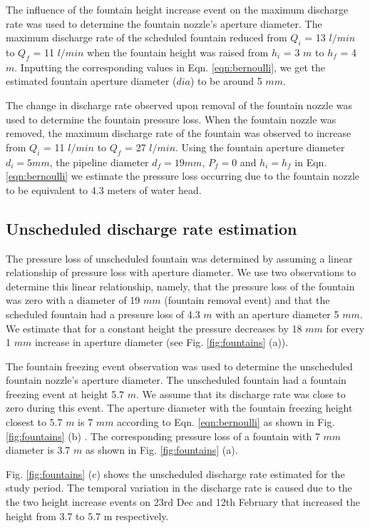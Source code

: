 \documentclass[tc, manuscript]{copernicus}
\begin{document}
The influence of the fountain height increase event on the maximum discharge rate was used to determine the
fountain nozzle's aperture diameter. The maximum discharge rate of the scheduled fountain reduced from $Q_i$ =
13 $l/min$ to $Q_f$ = 11 $l/min$ when the fountain height was raised from  $h_i$ = 3 $m$ to $h_f$ = 4 $m$.
Inputting the corresponding values in Eqn. \ref{eqn:bernoulli}, we get the estimated fountain aperture diameter
($dia$) to be around 5 $mm$. 

The change in discharge rate observed upon removal of the fountain nozzle was used to determine the fountain
pressure loss. When the fountain nozzle was removed, the maximum discharge rate of the fountain was observed to
increase from $Q_{i}$ = 11 $l/min$ to $Q_{f}$ = 27 $l/min$. Using the fountain aperture diameter $d_i = 5 mm$,
the pipeline diameter $d_f = 19 mm$, $P_{f} = 0$ and $h_{i} = h_{f}$ in Eqn. \ref{eqn:bernoulli} we estimate the
pressure loss occurring due to the fountain nozzle to be equivalent to 4.3 meters of water head.

\subsection{Unscheduled discharge rate estimation}

The pressure loss of unscheduled fountain was determined by assuming a linear relationship of pressure loss with
aperture diameter. We use two observations to determine this linear relationship, namely, that the pressure loss
of the fountain was zero with a diameter of 19 $mm$ (fountain removal event) and that the scheduled fountain had
a pressure loss of 4.3 $m$ with an aperture diameter 5 $mm$. We estimate that for a constant height the pressure
decreases by 18 $mm$ for every 1 $mm$ increase in aperture diameter (see Fig. \ref{fig:fountains} (a)).

The fountain freezing event observation was used to determine the unscheduled fountain nozzle's aperture
diameter. The unscheduled fountain had a fountain freezing event at height 5.7 $m$. We assume that its discharge
rate was close to zero during this event.  The aperture diameter with the fountain freezing height closest to
5.7 $m$ is 7 $mm$ according to Eqn. \ref{eqn:bernoulli} as shown in Fig. \ref{fig:fountains} (b) . The
corresponding pressure loss of a fountain with 7 $mm$ diameter is 3.7 $m$ as shown in Fig. \ref{fig:fountains}
(a).

Fig. \ref{fig:fountains} (c) shows the unscheduled discharge rate estimated for the study period. The temporal
variation in the discharge rate is caused due to the the two height increase events on 23rd Dec and 12th
February that increased the height from 3.7 to 5.7 m respectively.
\end{document}
